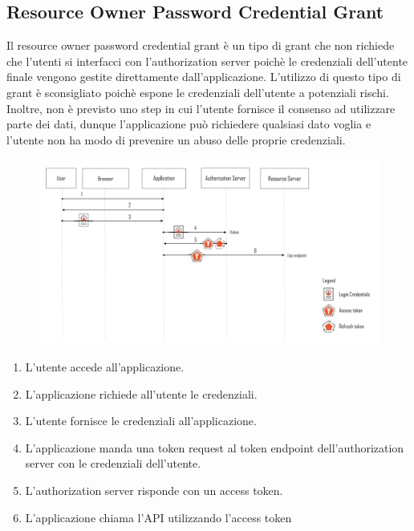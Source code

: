 \subsection{Resource Owner Password Credential Grant}

Il resource owner password credential grant è un tipo di grant che non richiede che
l'utenti si interfacci con l'authorization server poichè le credenziali dell'utente
finale vengono gestite direttamente dall'applicazione. L'utilizzo di questo
tipo di grant è sconsigliato poichè espone le credenziali dell'utente a potenziali rischi.
Inoltre, non è previsto uno step in cui l'utente fornisce il consenso ad utilizzare parte
dei dati, dunque l'applicazione può richiedere qualsiasi dato voglia e l'utente non ha
modo di prevenire un abuso delle proprie credenziali.

\begin{figure}[H]
      \centering
      \includegraphics[width=\textwidth, keepaspectratio]{capitoli/id_managing/imgs/passgrant.png}
\end{figure}

\begin{enumerate}
      \item L'utente accede all'applicazione.
      \item L'applicazione richiede all'utente le credenziali.
      \item L'utente fornisce le credenziali all'applicazione.
      \item L'applicazione manda una token request al token endpoint dell'authorization
            server con le credenziali dell'utente.
      \item L'authorization server risponde con un access token.
      \item L'applicazione chiama l'API utilizzando l'access token
\end{enumerate}

